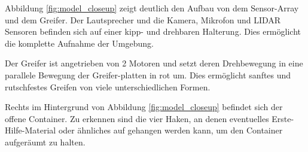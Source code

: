 Abbildung \ref{fig:model_closeup} zeigt deutlich den Aufbau von dem Sensor-Array und dem Greifer.
Der Lautsprecher und die Kamera, Mikrofon und LIDAR Sensoren 
befinden sich auf einer kipp- und drehbaren Halterung.
Dies ermöglicht die komplette Aufnahme der Umgebung.

Der Greifer ist angetrieben von 2 Motoren und setzt deren Drehbewegung 
in eine parallele Bewegung der Greifer-platten in rot um.
Dies ermöglicht sanftes und rutschfestes Greifen von viele unterschiedlichen Formen.

Rechts im Hintergrund von Abbildung \ref{fig:model_closeup} befindet sich der offene Container.
Zu erkennen sind die vier Haken, 
an denen eventuelles Erste-Hilfe-Material oder ähnliches auf gehangen werden kann,
um den Container aufgeräumt zu halten.

